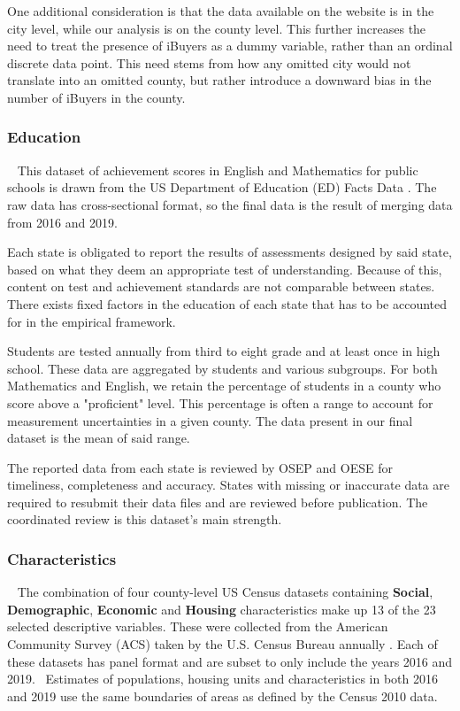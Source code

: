 One additional consideration is that the data available on the website is in the city level, while our analysis is on the county level. This further increases the need to treat the presence of iBuyers as a dummy variable, rather than an ordinal discrete data point. This need stems from how any omitted city would not translate into an omitted county, but rather introduce a downward bias in the number of iBuyers in the county.

\subsubsection{Education} 
This dataset of achievement scores in English and Mathematics for public schools is drawn from the US Department of Education (ED) Facts Data \cite{EDF}. The raw data has cross-sectional format, so the final data is the result of merging data from 2016 and 2019.  

Each state is obligated to report the results of assessments designed by said state, based on what they deem an appropriate test of understanding. Because of this, content on test and achievement standards are not comparable between states. There exists fixed factors in the education of each state that has to be accounted for in the empirical framework.  

Students are tested annually from third to eight grade and at least once in high school. These data are aggregated by students and various subgroups. For both Mathematics and English, we retain the percentage of students in a county who score above a "proficient" level. This percentage is often a range to account for measurement uncertainties in a given county. The data present in our final dataset is the mean of said range. 

The reported data from each state is reviewed by OSEP and OESE for timeliness, completeness and accuracy. States with missing or inaccurate data are required to resubmit their data files and are reviewed before publication. The coordinated review is this dataset’s main strength. 


\subsubsection{Characteristics} 
The combination of four county-level US Census datasets containing \textbf{Social}, \textbf{Demographic}, \textbf{Economic} and \textbf{Housing} characteristics make up 13 of the 23 selected descriptive variables. These were collected from the American Community Survey (ACS) taken by the U.S. Census Bureau annually \cite{ACS}. Each of these datasets has panel format and are subset to only include the years 2016 and 2019.  Estimates of populations, housing units and characteristics in both 2016 and 2019 use the same boundaries of areas as defined by the Census 2010 data.  

